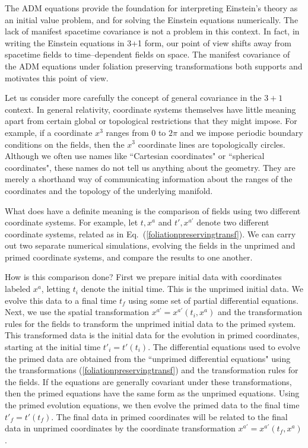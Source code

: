 The ADM equations provide the foundation for interpreting Einstein's theory as an initial value problem, 
and for solving the Einstein equations numerically. 
The lack of manifest spacetime covariance is not a problem in this context. In fact, in writing the Einstein equations in 3+1 
form, our point of view shifts away from 
spacetime fields to time--dependent fields on space. The manifest covariance of the ADM equations under foliation preserving 
transformations both supports and motivates this point of view. 

Let us consider more carefully the concept of general covariance in the $3+1$ context. 
In general relativity, coordinate systems themselves have little meaning apart from certain 
global or topological restrictions that they might impose. For example, if a coordinate $x^3$ ranges from $0$ to $2\pi$ 
and we impose periodic boundary conditions on the fields, then the $x^3$ coordinate lines are topologically circles. 
Although we often use names like ``Cartesian coordinates" or ``spherical coordinates", these names do not tell us anything 
about the geometry. They 
are merely a shorthand way of communicating information about the ranges of the coordinates and the topology of the underlying manifold. 

What does have a definite meaning is the comparison of fields using two different coordinate systems. For example, let 
$t,x^{a}$ and $t',x^{a'}$ denote  
two different coordinate systems, related as in Eq.~(\ref{foliationpreservingtransf}). We can carry out two separate numerical simulations, 
evolving the fields in the unprimed and primed coordinate systems, and compare the results to one another.  

How is this comparison done? 
First we prepare initial data with coordinates labeled $x^a$, letting $t_i$ denote the initial time. This is the unprimed initial data. We evolve this data to a final 
time $t_f$ using some set of partial differential equations. Next, we use 
the spatial transformation $x^{a'} = x^{a'}(t_i,x^a)$ and the transformation rules for the fields to transform the unprimed initial data to the primed 
system. This transformed data is the initial data for the evolution in primed coordinates, starting at the initial time $t'_i = t'(t_i)$. 
The differential equations used to evolve the primed data are obtained from the ``unprimed differential equations" using the transformations (\ref{foliationpreservingtransf}) and 
the transformation rules for the fields. If the equations are generally covariant under these transformations, then the primed equations have the same form 
as the unprimed equations. Using the primed evolution equations, we then evolve the primed data to the final 
time $t'_f = t'(t_f)$. The final data in primed coordinates will be related to the final data in unprimed coordinates by the coordinate transformation 
$x^{a'} = x^{a'}(t_f,x^a)$. 

